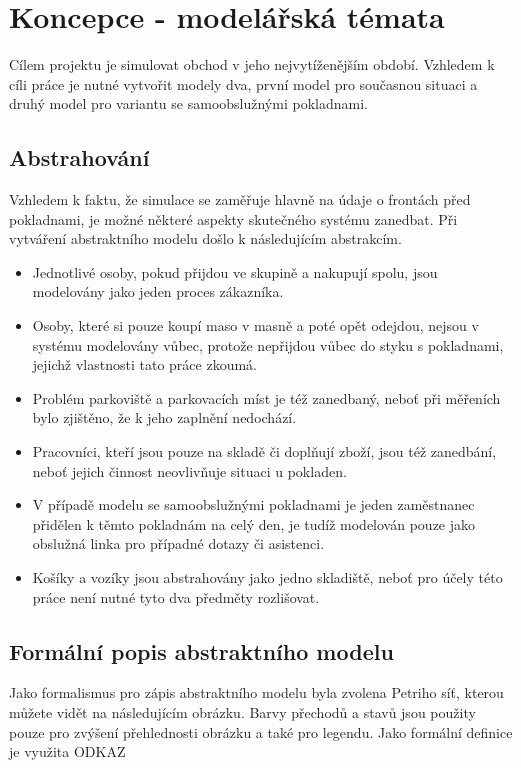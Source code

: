 \documentclass[12pt,a4paper,titlepage]{article}
\begin{document}
\section{Koncepce - modelářská témata}
Cílem projektu je simulovat obchod v jeho nejvytíženějším období. Vzhledem k cíli práce je nutné vytvořit modely dva, první model pro současnou situaci a druhý model pro variantu se samoobslužnými pokladnami. 

\subsection{Abstrahování}
Vzhledem k faktu, že simulace se zaměřuje hlavně na údaje o frontách před pokladnami, je možné některé aspekty skutečného systému zanedbat. Při vytváření abstraktního modelu došlo k následujícím abstrakcím. 
\begin{itemize}
\item Jednotlivé osoby, pokud přijdou ve skupině a nakupují spolu, jsou modelovány jako jeden proces zákazníka.
\item Osoby, které si pouze koupí maso v masně a poté opět odejdou, nejsou v systému modelovány vůbec, protože nepřijdou vůbec do styku s pokladnami, jejichž vlastnosti tato práce zkoumá. 
\item Problém parkoviště a parkovacích míst je též zanedbaný, neboť při měřeních bylo zjištěno, že k jeho zaplnění nedochází.
\item Pracovníci, kteří jsou pouze na skladě či doplňují zboží, jsou též zanedbání, neboť jejich činnost neovlivňuje situaci u pokladen. 
\item V případě modelu se samoobslužnými pokladnami je jeden zaměstnanec přidělen k těmto pokladnám na celý den, je tudíž modelován pouze jako obslužná linka pro případné dotazy či asistenci.
\item Košíky a vozíky jsou abstrahovány jako jedno skladiště, neboť pro účely této práce není nutné tyto dva předměty rozlišovat.   
\end{itemize}


\subsection{Formální popis abstraktního modelu}
Jako formalismus pro zápis abstraktního modelu byla zvolena Petriho síť, kterou můžete vidět na následujícím obrázku. Barvy přechodů a stavů jsou použity pouze pro zvýšení přehlednosti obrázku a také pro legendu. Jako formální definice je využita ODKAZ  \\
\end{document}
